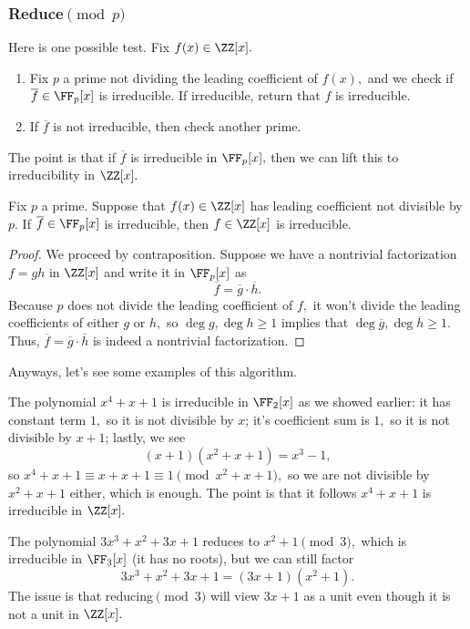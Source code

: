 \documentclass[../notes.tex]{subfiles}
\begin{document}
\subsubsection{Reduce\texorpdfstring{$\pmod p$}{}}
Here is one possible test. Fix $f(x)\in\ZZ[x].$
\begin{enumerate}
	\item Fix $p$ a prime not dividing the leading coefficient of $f(x),$ and we check if $\overline f\in\FF_p[x]$ is irreducible. If irreducible, return that $f$ is irreducible.
	\item If $\overline f$ is not irreducible, then check another prime.
\end{enumerate}
The point is that if $\overline f$ is irreducible in $\FF_p[x],$ then we can lift this to irreducibility in $\ZZ[x].$
\begin{lemma}
	Fix $p$ a prime. Suppose that $f(x)\in\ZZ[x]$ has leading coefficient not divisible by $p.$ If $\overline f\in\FF_p[x]$ is irreducible, then $f\in\ZZ[x]$ is irreducible.
\end{lemma}
\begin{proof}
	We proceed by contraposition. Suppose we have a nontrivial factorization $f=gh$ in $\ZZ[x]$ and write it in $\FF_p[x]$ as
	\[\overline f=\overline g\cdot\overline h.\]
	Because $p$ does not divide the leading coefficient of $f,$ it won't divide the leading coefficients of either $g$ or $h,$ so $\deg g,\deg h\ge1$ implies that $\deg\overline g,\deg\overline h\ge1.$ Thus, $\overline f=\overline g\cdot\overline h$ is indeed a nontrivial factorization.
\end{proof}
Anyways, let's see some examples of this algorithm.
\begin{example}
	The polynomial $x^4+x+1$ is irreducible in $\FF_2[x]$ as we showed earlier: it has constant term $1,$ so it is not divisible by $x$; it's coefficient sum is $1,$ so it is not divisible by $x+1$; lastly, we see
	\[(x+1)\left(x^2+x+1\right)=x^3-1,\]
	so $x^4+x+1\equiv x+x+1\equiv1\pmod{x^2+x+1},$ so we are not divisible by $x^2+x+1$ either, which is enough. The point is that it follows $x^4+x+1$ is irreducible in $\ZZ[x].$
\end{example}
\begin{nex}
	The polynomial $3x^3+x^2+3x+1$ reduces to $x^2+1\pmod3,$ which is irreducible in $\FF_3[x]$ (it has no roots), but we can still factor
	\[3x^3+x^2+3x+1=(3x+1)\left(x^2+1\right).\]
	The issue is that reducing$\pmod3$ will view $3x+1$ as a unit even though it is not a unit in $\ZZ[x].$
\end{nex}
\end{document}

